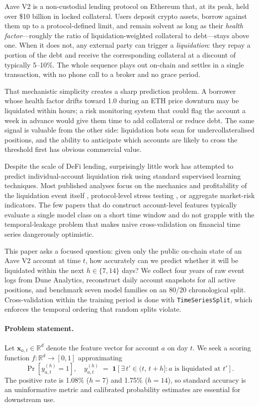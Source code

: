 \documentclass[12pt,a4paper]{article}
\newcommand{\bm}[1]{\boldsymbol{#1}}
\begin{document}
Aave V2 is a non-custodial lending protocol on Ethereum that, at its peak,
held over \$10 billion in locked collateral.  Users deposit crypto assets,
borrow against them up to a protocol-defined limit, and remain solvent as long
as their \emph{health factor}---roughly the ratio of
liquidation-weighted collateral to debt---stays above one.  When it does not,
any external party can trigger a \emph{liquidation}: they repay a portion of
the debt and receive the corresponding collateral at a discount of typically
5--10\%.  The whole sequence plays out on-chain and settles in a single
transaction, with no phone call to a broker and no grace period.

That mechanistic simplicity creates a sharp prediction problem.  A borrower
whose health factor drifts toward 1.0 during an ETH price downturn may be
liquidated within hours; a risk monitoring system that could flag the account
a week in advance would give them time to add collateral or reduce debt.
The same signal is valuable from the other side: liquidation bots scan
for undercollateralised positions, and the ability to anticipate which
accounts are likely to cross the threshold first has obvious commercial value.

Despite the scale of DeFi lending, surprisingly little work has attempted
to predict individual-account liquidation risk using standard supervised
learning techniques.  Most published analyses focus on the mechanics and
profitability of the liquidation event itself \citep{qin2021liquidations},
protocol-level stress testing \citep{gauntlet2022}, or aggregate market-risk
indicators.  The few papers that do construct account-level features
typically evaluate a single model class on a short time window and do not
grapple with the temporal-leakage problem that makes naive cross-validation
on financial time series dangerously optimistic.

This paper asks a focused question: given only the public on-chain state of
an Aave V2 account at time $t$, how accurately can we predict whether it will
be liquidated within the next $h \in \{7, 14\}$ days?  We collect four years
of raw event logs from Dune Analytics, reconstruct daily account snapshots for
all active positions, and benchmark seven model families on an 80/20
chronological split.  Cross-validation within the training period is done
with \texttt{TimeSeriesSplit}, which enforces the temporal ordering that
random splits violate.

\paragraph{Problem statement.}
Let $\bm{x}_{a,t} \in \mathbb{R}^{d}$ denote the feature vector for account
$a$ on day $t$.  We seek a scoring function $f: \mathbb{R}^{d} \to [0,1]$
approximating
\[
    \Pr\!\left[y_{a,t}^{(h)} = 1\right],
    \quad
    y_{a,t}^{(h)} \;=\; \mathbf{1}\!\left[\exists\, t' \in (t,\, t{+}h] :
    a \text{ is liquidated at } t'\right].
\]
The positive rate is 1.08\% ($h{=}7$) and 1.75\% ($h{=}14$), so standard
accuracy is an uninformative metric and calibrated probability estimates are
essential for downstream use.
\end{document}
